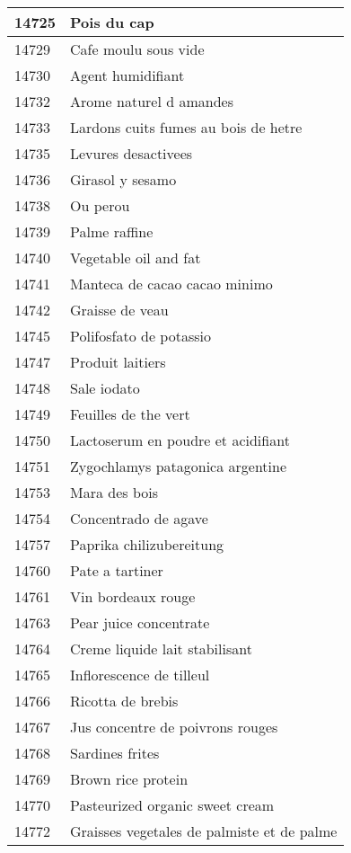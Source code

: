 \begin{longtable}{|l|l|}
14725 & Pois du cap \\ \hline 
14729 & Cafe moulu sous vide \\ \hline 
14730 & Agent humidifiant \\ \hline 
14732 & Arome naturel d amandes \\ \hline 
14733 & Lardons cuits fumes au bois de hetre \\ \hline 
14735 & Levures desactivees \\ \hline 
14736 & Girasol y sesamo \\ \hline 
14738 & Ou perou \\ \hline 
14739 & Palme raffine \\ \hline 
14740 & Vegetable oil and fat \\ \hline 
14741 & Manteca de cacao cacao minimo \\ \hline 
14742 & Graisse de veau \\ \hline 
14745 & Polifosfato de potassio \\ \hline 
14747 & Produit laitiers \\ \hline 
14748 & Sale iodato \\ \hline 
14749 & Feuilles de the vert \\ \hline 
14750 & Lactoserum en poudre et acidifiant \\ \hline 
14751 & Zygochlamys patagonica argentine \\ \hline 
14753 & Mara des bois \\ \hline 
14754 & Concentrado de agave \\ \hline 
14757 & Paprika chilizubereitung \\ \hline 
14760 & Pate a tartiner \\ \hline 
14761 & Vin bordeaux rouge \\ \hline 
14763 & Pear juice concentrate \\ \hline 
14764 & Creme liquide lait stabilisant \\ \hline 
14765 & Inflorescence de tilleul \\ \hline 
14766 & Ricotta de brebis \\ \hline 
14767 & Jus concentre de poivrons rouges \\ \hline 
14768 & Sardines frites \\ \hline 
14769 & Brown rice protein \\ \hline 
14770 & Pasteurized organic sweet cream \\ \hline 
14772 & Graisses vegetales de palmiste et de palme \\ \hline 

\end{longtable}
